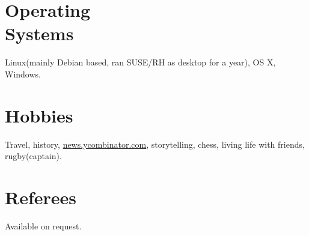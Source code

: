 \documentclass[margin,line]{resume}
\begin{document}
\begin{resume}
    \section{\mysidestyle Operating \\Systems}
    Linux(mainly Debian based, ran SUSE/RH as desktop for a year), OS X, Windows.

    \section{\mysidestyle Hobbies}
    Travel, history, \href{http://news.ycombinator.com}{news.ycombinator.com}, storytelling, chess, living life with friends, rugby(captain).

    \section{\mysidestyle Referees} 
    Available on request.

\end{resume}
\end{document}
